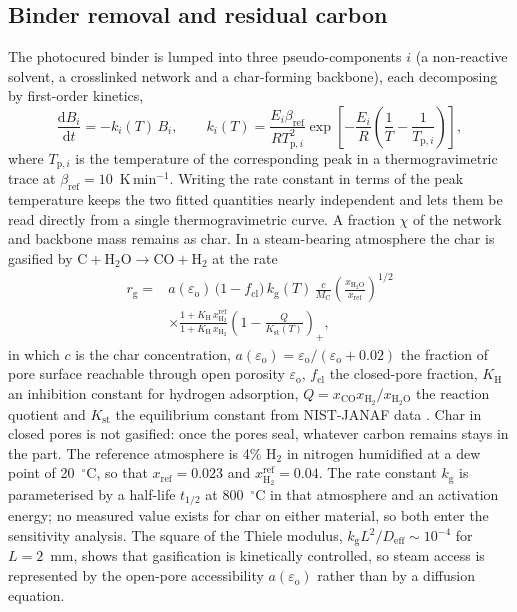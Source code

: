 \subsection{Binder removal and residual carbon}
\label{sec:binder}

The photocured binder is lumped into three pseudo-components $i$ (a non-reactive solvent, a crosslinked network and a char-forming backbone), each decomposing by first-order kinetics,
\begin{equation}
\frac{\mathrm{d}B_i}{\mathrm{d}t} = -k_i(T)\,B_i,\qquad
k_i(T) = \frac{E_i\beta_{\mathrm{ref}}}{R T_{\mathrm{p},i}^2}\exp\!\left[-\frac{E_i}{R}\left(\frac{1}{T}-\frac{1}{T_{\mathrm{p},i}}\right)\right],
\label{eq:binder}
\end{equation}
where $T_{\mathrm{p},i}$ is the temperature of the corresponding peak in a thermogravimetric trace at $\beta_{\mathrm{ref}} = 10$~K\,min$^{-1}$. Writing the rate constant in terms of the peak temperature keeps the two fitted quantities nearly independent and lets them be read directly from a single thermogravimetric curve. A fraction $\chi$ of the network and backbone mass remains as char. In a steam-bearing atmosphere the char is gasified by $\mathrm{C} + \mathrm{H_2O} \rightarrow \mathrm{CO} + \mathrm{H_2}$ at the rate
\begin{equation}
\begin{split}
r_{\mathrm{g}} ={}& a(\varepsilon_{\mathrm{o}})\,\bigl(1-f_{\mathrm{cl}}\bigr)\,k_{\mathrm{g}}(T)\,\frac{c}{M_{\mathrm{C}}}
\left(\frac{x_{\mathrm{H_2O}}}{x_{\mathrm{ref}}}\right)^{1/2}\\
&\times\frac{1+K_{\mathrm{H}}\,x_{\mathrm{H_2}}^{\mathrm{ref}}}{1+K_{\mathrm{H}}\,x_{\mathrm{H_2}}}
\left(1-\frac{Q}{K_{\mathrm{st}}(T)}\right)_{+},
\end{split}
\label{eq:gasif}
\end{equation}
in which $c$ is the char concentration, $a(\varepsilon_{\mathrm{o}}) = \varepsilon_{\mathrm{o}}/(\varepsilon_{\mathrm{o}}+0.02)$ the fraction of pore surface reachable through open porosity $\varepsilon_{\mathrm{o}}$, $f_{\mathrm{cl}}$ the closed-pore fraction, $K_{\mathrm{H}}$ an inhibition constant for hydrogen adsorption, $Q = x_{\mathrm{CO}}x_{\mathrm{H_2}}/x_{\mathrm{H_2O}}$ the reaction quotient and $K_{\mathrm{st}}$ the equilibrium constant from NIST-JANAF data \cite{chase1998janaf}. Char in closed pores is not gasified: once the pores seal, whatever carbon remains stays in the part. The reference atmosphere is 4\% H$_2$ in nitrogen humidified at a dew point of 20~$^\circ$C, so that $x_{\mathrm{ref}} = 0.023$ and $x_{\mathrm{H_2}}^{\mathrm{ref}} = 0.04$. The rate constant $k_{\mathrm{g}}$ is parameterised by a half-life $t_{1/2}$ at 800~$^\circ$C in that atmosphere and an activation energy; no measured value exists for char on either material, so both enter the sensitivity analysis. The square of the Thiele modulus, $k_{\mathrm{g}}L^2/D_{\mathrm{eff}} \sim 10^{-4}$ for $L = 2$~mm, shows that gasification is kinetically controlled, so steam access is represented by the open-pore accessibility $a(\varepsilon_{\mathrm{o}})$ rather than by a diffusion equation.

